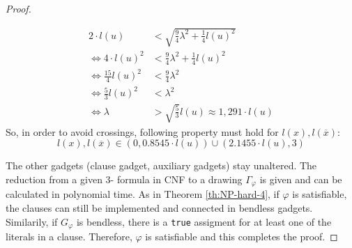 \begin{proof}
\begin{itemize}
		\begin{align*}
		2\cdot l(u) &< \sqrt{\frac{9}{4}\lambda^2 + \frac{1}{4}l(u)^2}\\
		\Leftrightarrow 4\cdot l(u)^2 &< \frac{9}{4}\lambda^2 + \frac{1}{4}l(u)^2\\
		\Leftrightarrow \frac{15}{4} l(u)^2 &< \frac{9}{4}\lambda^2\\
		\Leftrightarrow \frac{5}{3} l(u)^2 &< \lambda^2\\
		\Leftrightarrow \lambda &> \sqrt{\frac{5}{3}}l(u) \approx 1,291\cdot l(u)
		\end{align*}
		So, in order to avoid crossings, following property must hold for $l(x),l(\overline{x})$:
		$$l(x),l(\overline{x}) \in (0,0.8545\cdot l(u)) \cup (2.1455 \cdot l(u),3)$$
	\end{itemize}
	The other gadgets (clause gadget, auxiliary gadgets) stay unaltered. The reduction from a given 3- formula in CNF to a drawing $\Gamma_\varphi$ is given and can be calculated in polynomial time. As in Theorem \ref{th:NP-hard-4}, if $\varphi$ is satisfiable, the clauses can still be implemented and connected in bendless gadgets. Similarily, if $G_\varphi$ is bendless, there is a \texttt{true} assigment for at least one of the literals in a clause. Therefore, $\varphi$ is satisfiable and this completes the proof.
\end{proof}

